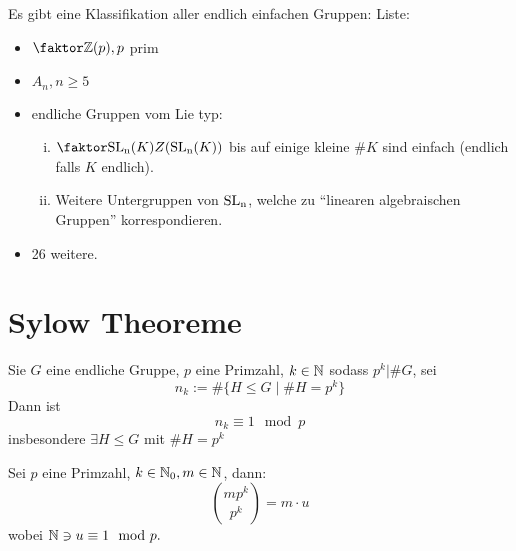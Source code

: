 \documentclass[a4paper]{report}
\begin{document}
\begin{bem*}
  Es gibt eine Klassifikation aller endlich einfachen Gruppen:
  Liste:
  \begin{itemize}
    \item $\fak \Z{(p)}, p$ prim
    \item $A_{n}, n \ge 5$
    \item endliche Gruppen vom Lie typ:
          \begin{enumerate}[(i)]
            \item $\fak {\SLn(K)}{Z(\SLn(K))}$ bis auf einige kleine $\#K$ sind einfach (endlich falls $K$ endlich).
            \item Weitere Untergruppen von $\operatorname{SL_n}$, welche zu ``linearen algebraischen Gruppen'' korrespondieren.
          \end{enumerate}
          \item 26 weitere.
  \end{itemize}
\end{bem*}

\section{Sylow Theoreme}
\begin{satz}
  Sie $G$ eine endliche Gruppe, $p$ eine Primzahl, $k \in \mathbb{N}$ sodass $p^{k} | \#G$, sei
  \[n_{k}:= \#\{H \le G \mid \#H = p^{k}\}\]
  Dann ist
  \[n_{k} \equiv 1 \mod p\]
  insbesondere $\exists H \le G$ mit $\#H = p^{k}$
\end{satz}
\begin{ubng*}[Vorbereitung]
  Sei $p$ eine Primzahl, $k \in \mathbb{N}_0, m \in \mathbb{N}$, dann:
  \[\binom {mp^{k}}{p^{k}} = m \cdot u\]
  wobei $\mathbb{N} \ni u \equiv 1 \mod p.$

\end{ubng*}
\end{document}
